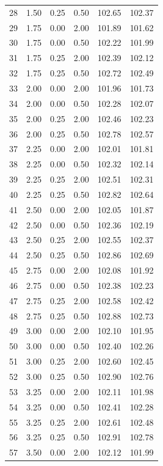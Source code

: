 \begin{tabular}{rrrrrr}
  28 & 1.50 & 0.25 & 0.50 & 102.65 & 102.37 \\ 
  29 & 1.75 & 0.00 & 2.00 & 101.89 & 101.62 \\ 
  30 & 1.75 & 0.00 & 0.50 & 102.22 & 101.99 \\ 
  31 & 1.75 & 0.25 & 2.00 & 102.39 & 102.12 \\ 
  32 & 1.75 & 0.25 & 0.50 & 102.72 & 102.49 \\ 
  33 & 2.00 & 0.00 & 2.00 & 101.96 & 101.73 \\ 
  34 & 2.00 & 0.00 & 0.50 & 102.28 & 102.07 \\ 
  35 & 2.00 & 0.25 & 2.00 & 102.46 & 102.23 \\ 
  36 & 2.00 & 0.25 & 0.50 & 102.78 & 102.57 \\ 
  37 & 2.25 & 0.00 & 2.00 & 102.01 & 101.81 \\ 
  38 & 2.25 & 0.00 & 0.50 & 102.32 & 102.14 \\ 
  39 & 2.25 & 0.25 & 2.00 & 102.51 & 102.31 \\ 
  40 & 2.25 & 0.25 & 0.50 & 102.82 & 102.64 \\ 
  41 & 2.50 & 0.00 & 2.00 & 102.05 & 101.87 \\ 
  42 & 2.50 & 0.00 & 0.50 & 102.36 & 102.19 \\ 
  43 & 2.50 & 0.25 & 2.00 & 102.55 & 102.37 \\ 
  44 & 2.50 & 0.25 & 0.50 & 102.86 & 102.69 \\ 
  45 & 2.75 & 0.00 & 2.00 & 102.08 & 101.92 \\ 
  46 & 2.75 & 0.00 & 0.50 & 102.38 & 102.23 \\ 
  47 & 2.75 & 0.25 & 2.00 & 102.58 & 102.42 \\ 
  48 & 2.75 & 0.25 & 0.50 & 102.88 & 102.73 \\ 
  49 & 3.00 & 0.00 & 2.00 & 102.10 & 101.95 \\ 
  50 & 3.00 & 0.00 & 0.50 & 102.40 & 102.26 \\ 
  51 & 3.00 & 0.25 & 2.00 & 102.60 & 102.45 \\ 
  52 & 3.00 & 0.25 & 0.50 & 102.90 & 102.76 \\ 
  53 & 3.25 & 0.00 & 2.00 & 102.11 & 101.98 \\ 
  54 & 3.25 & 0.00 & 0.50 & 102.41 & 102.28 \\ 
  55 & 3.25 & 0.25 & 2.00 & 102.61 & 102.48 \\ 
  56 & 3.25 & 0.25 & 0.50 & 102.91 & 102.78 \\ 
  57 & 3.50 & 0.00 & 2.00 & 102.12 & 101.99 \\ 

\end{tabular}
